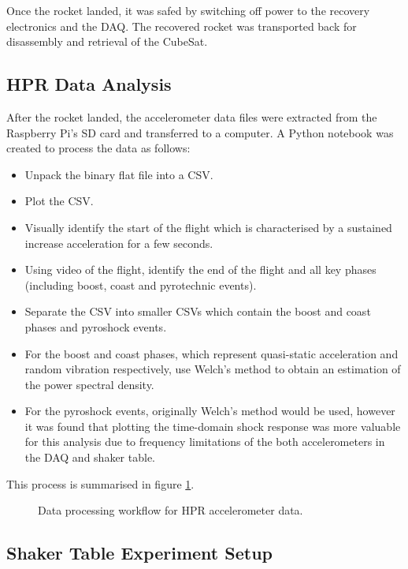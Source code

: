 \documentclass{report}
\begin{document}
Once the rocket landed, it was safed by switching off power to the recovery electronics and the DAQ. The recovered rocket was transported back for disassembly and retrieval of the CubeSat.

\subsection{HPR Data Analysis}

After the rocket landed, the accelerometer data files were extracted from the Raspberry Pi's SD card and transferred to a computer. A Python notebook was created to process the data as follows:

\begin{itemize}
  \item Unpack the binary flat file into a CSV.
  \item Plot the CSV.
  \item Visually identify the start of the flight which is characterised by a sustained increase acceleration for a few seconds.
  \item Using video of the flight, identify the end of the flight and all key phases (including boost, coast and pyrotechnic events).
  \item Separate the CSV into smaller CSVs which contain the boost and coast phases and pyroshock events.
  \item For the boost and coast phases, which represent quasi-static acceleration and random vibration respectively, use Welch's method to obtain an estimation of the power spectral density.
  \item For the pyroshock events, originally Welch's method would be used, however it was found that plotting the time-domain shock response was more valuable for this analysis due to frequency limitations of the both accelerometers in the DAQ and shaker table.
\end{itemize}

This process is summarised in figure \ref{fig:hpr-data-processing}.

\begin{figure}[H]
  \centering
  
  \caption{Data processing workflow for HPR accelerometer data.}
  \label{fig:hpr-data-processing}
\end{figure}

\subsection{Shaker Table Experiment Setup}
\end{document}
